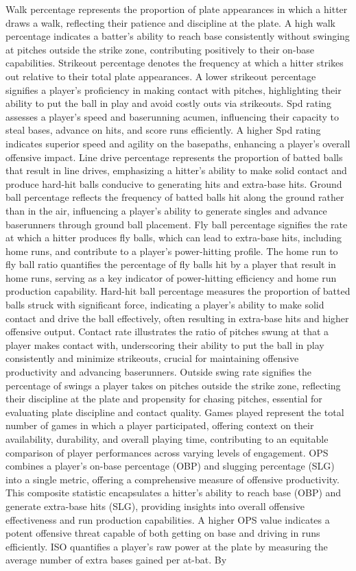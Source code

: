 \documentclass[12pt, english]{article}
\begin{document}
Walk percentage represents the proportion of plate appearances in which a hitter draws a walk, reflecting their patience and discipline at the plate. A high walk percentage indicates a batter's ability to reach base consistently without swinging at pitches outside the strike zone, contributing positively to their on-base capabilities. Strikeout percentage denotes the frequency at which a hitter strikes out relative to their total plate appearances. A lower strikeout percentage signifies a player's proficiency in making contact with pitches, highlighting their ability to put the ball in play and avoid costly outs via strikeouts. Spd rating assesses a player's speed and baserunning acumen, influencing their capacity to steal bases, advance on hits, and score runs efficiently. A higher Spd rating indicates superior speed and agility on the basepaths, enhancing a player's overall offensive impact. Line drive percentage represents the proportion of batted balls that result in line drives, emphasizing a hitter's ability to make solid contact and produce hard-hit balls conducive to generating hits and extra-base hits. Ground ball percentage reflects the frequency of batted balls hit along the ground rather than in the air, influencing a player's ability to generate singles and advance baserunners through ground ball placement. Fly ball percentage signifies the rate at which a hitter produces fly balls, which can lead to extra-base hits, including home runs, and contribute to a player's power-hitting profile. The home run to fly ball ratio quantifies the percentage of fly balls hit by a player that result in home runs, serving as a key indicator of power-hitting efficiency and home run production capability. Hard-hit ball percentage measures the proportion of batted balls struck with significant force, indicating a player's ability to make solid contact and drive the ball effectively, often resulting in extra-base hits and higher offensive output. Contact rate illustrates the ratio of pitches swung at that a player makes contact with, underscoring their ability to put the ball in play consistently and minimize strikeouts, crucial for maintaining offensive productivity and advancing baserunners. Outside swing rate signifies the percentage of swings a player takes on pitches outside the strike zone, reflecting their discipline at the plate and propensity for chasing pitches, essential for evaluating plate discipline and contact quality. Games played represent the total number of games in which a player participated, offering context on their availability, durability, and overall playing time, contributing to an equitable comparison of player performances across varying levels of engagement. OPS combines a player's on-base percentage (OBP) and slugging percentage (SLG) into a single metric, offering a comprehensive measure of offensive productivity. This composite statistic encapsulates a hitter's ability to reach base (OBP) and generate extra-base hits (SLG), providing insights into overall offensive effectiveness and run production capabilities. A higher OPS value indicates a potent offensive threat capable of both getting on base and driving in runs efficiently. ISO quantifies a player's raw power at the plate by measuring the average number of extra bases gained per at-bat. By 
\end{document}
